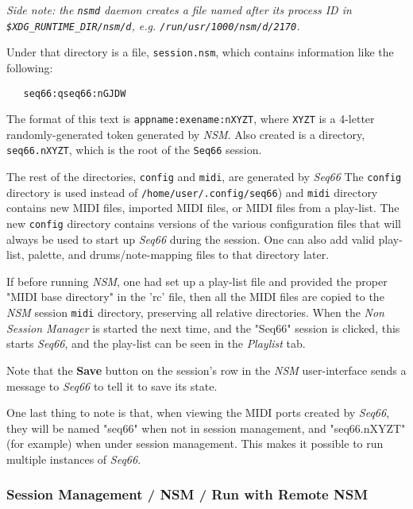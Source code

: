    \textsl{Side note: the \texttt{nsmd} daemon creates a file named after its
   process ID in \texttt{\$XDG\_RUNTIME\_DIR/nsm/d}, e.g.
   \texttt{/run/usr/1000/nsm/d/2170}.}

   Under that directory is a file, \texttt{session.nsm}, which
   contains information like the following:

\begin{verbatim}
   seq66:qseq66:nGJDW
\end{verbatim}

   The format of this text is \texttt{appname:exename:nXYZT}, where
   \texttt{XYZT} is a 4-letter randomly-generated token
   generated by \textsl{NSM}.
   Also created is a directory, \texttt{seq66.nXYZT}, which is the root of the
   \texttt{Seq66} session.

   The rest of the directories,
   \texttt{config} and \texttt{midi},
   are generated by \textsl{Seq66}
   The \texttt{config} directory is used instead of
   \texttt{/home/user/.config/seq66}) and \texttt{midi} directory
   contains new MIDI files, imported MIDI files,
   or MIDI files from a play-list.
   The new \texttt{config} directory
   contains versions of the various configuration files that will always be
   used to start up \textsl{Seq66} during the session.
   One can also add valid play-list, palette, and drums/note-mapping files to
   that directory later.

   If before running \textsl{NSM},
   one had set up a play-list file and provided the proper "MIDI
   base directory" in the 'rc' file, then all the MIDI files are copied to
   the \textsl{NSM} session \texttt{midi} directory,
   preserving all relative directories.
   When the \textsl{Non Session Manager} is started the next time, and the
   "Seq66" session is clicked, this starts \textsl{Seq66}, and the play-list can
   be seen in the \textsl{Playlist} tab.

   Note that the \textbf{Save} button on the session's row in the
   \textsl{NSM} user-interface sends a message to \textsl{Seq66}
   to tell it to save its state.

   One last thing to note is that, when viewing the MIDI ports created by
   \textsl{Seq66}, they will be named "seq66" when not in session management,
   and "seq66.nXYZT" (for example) when under session management.  This makes
   it possible to run multiple instances of \textsl{Seq66}.

\subsubsection{Session Management / NSM / Run with Remote NSM}
\label{subsec:sessions_nsm_before_using_nsm}

